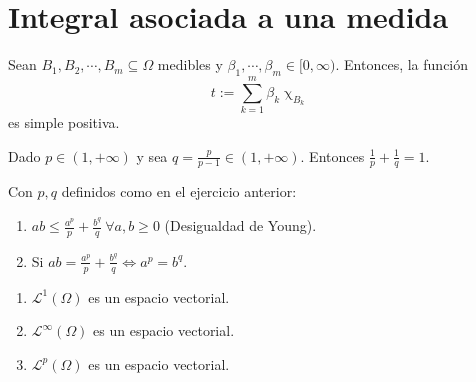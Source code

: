 \newpage



\section{Integral asociada a una medida}

\begin{ejer} Sean $B_1,B_2,\cdots,B_m \subseteq \Omega$ medibles y $\beta_1,\cdots,\beta_m\in[0,\infty)$. Entonces, la función $$t:= \sum_{k=1}^m \beta_k \upchi_{B_k}$$  es simple positiva.

\end{ejer}


\begin{ejer}
  Dado $p \in (1, +\infty)$ y sea $q = \frac{p}{p-1} \in (1, +\infty)$. Entonces $\frac{1}{p} + \frac{1}{q} = 1$.
\end{ejer}

\begin{ejer}
  Con $p, q$ definidos como en el ejercicio anterior:
  \begin{enumerate}
  \item $ \displaystyle ab \leq \frac{a^p}{p} + \frac{b^q}{q} \ \forall a, b \geq 0$ (Desigualdad de Young).
  \item Si $ \displaystyle ab = \frac{a^p}{p} + \frac{b^q}{q} \Leftrightarrow a^p = b^q$.
  \end{enumerate}
\end{ejer}

\begin{ejer}
  \begin{enumerate}
  \item $\mathcal L^{1} (\Omega)$ es un espacio vectorial.
  \item $\mathcal L^{\infty} (\Omega)$ es un espacio vectorial.
  \item $\mathcal L^{p} (\Omega)$ es un espacio vectorial.
  \end{enumerate}


\end{ejer}


